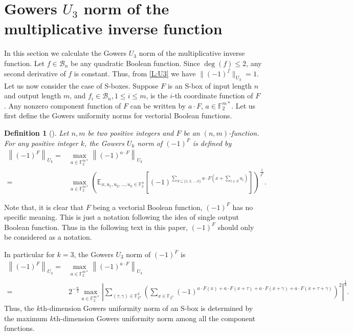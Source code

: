 \documentclass[12 pt]{article}
\newtheorem{definition}{Definition}
\def\E{{\mathbb E}}
\def\F{{\mathbb F}}
\begin{document}
\section{Gowers $U_3$ norm of the multiplicative inverse function}\label{sec:gw}
  In this section we calculate the Gowers $U_3$ norm of the multiplicative inverse function. 
  Let $f\in\mathcal{B}_n$ be any quadratic Boolean function. 
  Since $\deg(f)\le 2$, any second derivative of $f$ is constant. 
  Thus, from \eqref{L:U3} we have $\|(-1)^f\|_{U_3}=1$. 
  Let us now consider the case of S-boxes. 
  Suppose $F$ is an S-box of input length $n$ and output length $m$, and $f_i\in\mathcal{B}_n, 1\le i\le m$, is the $i$-th coordinate function of $F$. 
  Any nonzero component function of $F$ can be written by $a\cdot F$, $a\in\F_2^{m*}$. 
  Let us first define the Gowers uniformity norms for vectorial Boolean functions. 
  \begin{definition}[\cite{InverseFuncDAM2021}]\label{def-gower}
    Let $n,m$ be two positive integers and $F$ be an $(n,m)$-function. 
    For any positive integer $k$, the Gowers $U_k$ norm of $(-1)^F$  is defined by
    \begin{align*}
      \left\lVert(-1)^F\right\rVert_{U_k}=&\max_{a\in\F_2^{m*}} \left\lVert(-1)^{a\cdot F}\right\rVert_{U_k}\\
       =&\max_{a\in\F_2^{m*}}\left( \E_{x, u_1,u_2,\ldots,u_k\in\F_2^n}\left[ (-1)^{\sum_{S\subseteq\{1,2,\ldots,k\}}a\cdot F\left(x+\sum_{i\in S}u_i \right)} \right] \right)^{\frac{1}{2^k}}.
    \end{align*}
  \end{definition}
  Note that, it is clear that $F$ being a vectorial Boolean function, $(-1)^F$ has no specific meaning. 
  This is just a notation following the idea of single output Boolean function. 
  Thus in the following text in this paper, $(-1)^F$ should only be considered as a notation. 

  In particular for $k=3$, the Gowers $U_3$ norm of $(-1)^F$ is
  \begin{align*}
    \left\lVert(-1)^F\right\rVert_{U_3}=&\max_{a\in\F_2^{m*}} \left\lVert(-1)^{a\cdot F}\right\rVert_{U_3}\\
    =&2^{-{\frac{n}{2}}}\max_{a\in\F_2^{m*}}\left|\sum_{(\tau,\gamma)\in\F_{2^n}^2}\left(\sum_{x\in\F_{2^n}}(-1)^{a\cdot F(x)+a\cdot F(x+\tau)+a\cdot F(x+\gamma)+a\cdot F(x+\tau+\gamma)}\right)^2\right|^{\frac{1}{8}}.
  \end{align*}
  Thus, the $k$th-dimension Gowers uniformity norm of an S-box is determined by the maximum $k$th-dimension Gowers uniformity norm among all the component functions.
\end{document}
